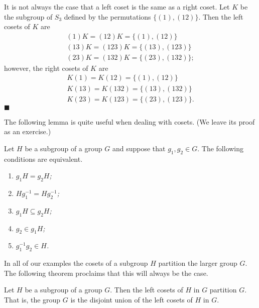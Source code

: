 It is not always the case that a left coset is the same as a right coset.  Let $K$ be the subgroup of $S_3$ defined by the permutations $\{(1), (1 2)\}$.  Then the left cosets of $K$ are
\begin{gather*}
(1)K = (1 2)K = \{(1), (1 2)\} \\
(1 3)K = (1 2 3)K = \{(1 3), (1 2 3)\} \\
(2 3)K = (1 3 2)K = \{(2 3), (1 3 2)\};
\end{gather*}
however, the right cosets of $K$ are
\begin{gather*}
K(1) = K(1 2) = \{(1), (1 2)\} \\
K(1 3) = K(1 3 2) = \{(1 3), (1 3 2)\} \\
K(2 3) = K(1 2 3) = \{(2 3), (1 2 3)\}.
\end{gather*}
\hspace{\fill} $\blacksquare$

\medskip

The following lemma is quite useful when dealing with cosets.  (We leave its proof as an exercise.)

\begin{lemma}\label{cosets_theorem_1}
Let $H$ be a subgroup of a group $G$ and suppose that $g_1, g_2 \in G$.  The following conditions are equivalent.  
\begin{enumerate}
 
\rm \item \it
$g_1 H = g_2 H$; 

\rm \item \it
$H g_1^{-1}  = H g_2^{-1}$; 

\rm \item \it
$g_1 H \subseteq g_2 H$; 

\rm \item \it
$g_2 \in g_1 H$; 

\rm \item \it
$g_1^{-1} g_2 \in H$.
 
\end{enumerate}
\end{lemma}

In all of our  examples the cosets of a subgroup $H$ partition the larger group $G$.  The following theorem proclaims that this will always be the case. 

\begin{theorem}\label{cosets_theorem_2}
Let $H$ be a subgroup of a group $G$.  Then the left cosets of $H$ in $G$ partition $G$.  That is, the group $G$ is the disjoint union of the left cosets of $H$ in $G$. 
\end{theorem}

